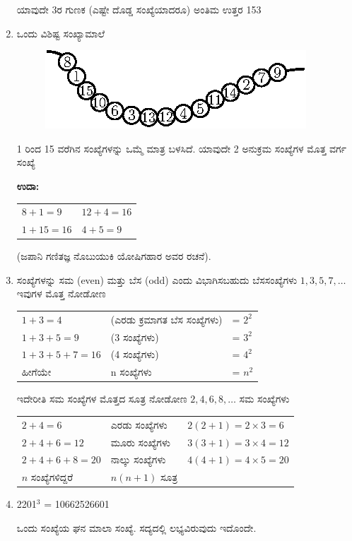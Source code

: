 \begin{enumerate}
ಯಾವುದೇ 3ರ ಗುಣಕ (ಎಷ್ಟೇ ದೊಡ್ಡ ಸಂಖ್ಯೆಯಾದರೂ) ಅಂತಿಮ ಉತ್ತರ 153

\item ಒಂದು ವಿಶಿಷ್ಟ ಸಂಖ್ಯಾಮಾಲೆ
\begin{figure}[H]
\centering
\includegraphics{images/chap1/q28.eps}
\end{figure}

1 ರಿಂದ 15 ವರೆಗಿನ ಸಂಖ್ಯೆಗಳನ್ನು ಒಮ್ಮೆ ಮಾತ್ರ ಬಳಸಿದೆ. ಯಾವುದೇ 2 ಅನುಕ್ರಮ ಸಂಖ್ಯೆಗಳ ಮೊತ್ತ ವರ್ಗ ಸಂಖ್ಯೆ

{\bf ಉದಾ:}
\begin{tabular}[t]{ll}
$8 + 1 = 9$ & $12 + 4 = 16$\\
$1 + 15 = 16$ & $4 + 5 = 9$
\end{tabular}

\hfill (ಜಪಾನಿ ಗಣಿತಜ್ಞ ನೊಬುಯುಕಿ ಯೋಷಿಗಹಾರ ಅವರ ರಚನೆ).

\item ಸಂಖ್ಯೆಗಳನ್ನು ಸಮ (even) ಮತ್ತು ಬೆಸ (odd) ಎಂದು ವಿಭಾಗಿಸಬಹುದು ಬೆಸ\break ಸಂಖ್ಯೆಗಳು $1, 3, 5, 7, \ldots$ ಇವುಗಳ ಮೊತ್ತ ನೋಡೋಣ

{\fontsize{11pt}{13pt}\selectfont
\begin{tabular}{lll}
$1 + 3 = 4$ &(ಎರಡು ಕ್ರಮಾಗತ ಬೆಸ ಸಂಖ್ಯೆಗಳು) & = $2^{2}$\\
$1 + 3 + 5 = 9$ &(3 ಸಂಖ್ಯೆಗಳು) & = $3^{2}$\\
$1 + 3 + 5 + 7 = 16$ &(4 ಸಂಖ್ಯೆಗಳು) & = $4^{2}$\\
ಹೀಗೆಯೇ & n ಸಂಖ್ಯೆಗಳು & = $n^{2}$
\end{tabular}}\relax

ಇದೇರೀತಿ ಸಮ ಸಂಖ್ಯೆಗಳ ಮೊತ್ತದ ಸೂತ್ರ ನೋಡೋಣ $2, 4, 6, 8, \ldots$ ಸಮ ಸಂಖ್ಯೆಗಳು

{\fontsize{11pt}{13pt}\selectfont
\begin{tabular}{lll}
$2 + 4= 6$ & ಎರಡು ಸಂಖ್ಯೆಗಳು & $2(2 + 1) = 2 \times 3 = 6$\\
$2 + 4 + 6 = 12$ & ಮೂರು ಸಂಖ್ಯೆಗಳು & $3(3 + 1) = 3 \times 4 = 12$\\
$2 + 4 + 6 + 8 = 20$ &ನಾಲ್ಕು ಸಂಖ್ಯೆಗಳು & $4(4 + 1) = 4 \times 5 = 20$\\
$n$ ಸಂಖ್ಯೆಗಳಿದ್ದರೆ & $n(n + 1)$ ಸೂತ್ರ &
\end{tabular}}\relax

\item 2201$^{3}$ = 10662526601

ಒಂದು ಸಂಖ್ಯೆಯ ಘನ ಮಾಲಾ ಸಂಖ್ಯೆ. ಸದ್ಯದಲ್ಲಿ ಲಭ್ಯವಿರುವುದು ಇದೊಂದೇ.
\end{enumerate}

